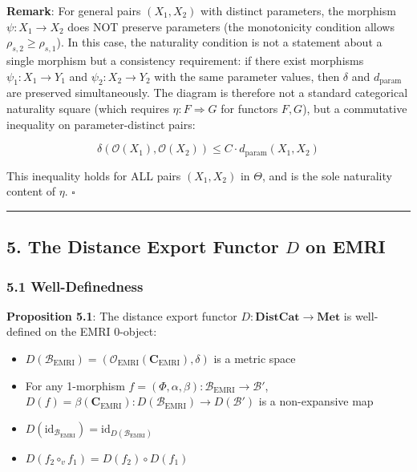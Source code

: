 \documentclass[
]{article}
\providecommand{\tightlist}{%
  \setlength{\itemsep}{0pt}\setlength{\parskip}{0pt}}
\begin{document}
\textbf{Remark}: For general pairs \((X_1, X_2)\) with distinct
parameters, the morphism \(\psi: X_1 \to X_2\) does NOT preserve
parameters (the monotonicity condition allows
\(\rho_{s,2} \geq \rho_{s,1}\)). In this case, the naturality condition
is not a statement about a single morphism but a consistency
requirement: if there exist morphisms \(\psi_1: X_1 \to Y_1\) and
\(\psi_2: X_2 \to Y_2\) with the same parameter values, then \(\delta\)
and \(d_{\text{param}}\) are preserved simultaneously. The diagram is
therefore not a standard categorical naturality square (which requires
\(\eta: F \Rightarrow G\) for functors \(F, G\)), but a commutative
inequality on parameter-distinct pairs:

\[\delta(\mathcal{O}(X_1), \mathcal{O}(X_2)) \leq C \cdot d_{\text{param}}(X_1, X_2)\]

This inequality holds for ALL pairs \((X_1, X_2)\) in \(\Theta\), and is
the sole naturality content of \(\eta\). \(\square\)

\begin{center}\rule{0.5\linewidth}{0.5pt}\end{center}

\subsection{\texorpdfstring{5. The Distance Export Functor \(D\) on
EMRI}{5. The Distance Export Functor D on EMRI}}\label{the-distance-export-functor-d-on-emri}

\subsubsection{5.1 Well-Definedness}\label{well-definedness}

\textbf{Proposition 5.1}: The distance export functor
\(D: \mathbf{DistCat} \to \mathbf{Met}\) is well-defined on the EMRI
0-object:

\begin{itemize}
\tightlist
\item
  \(D(\mathcal{B}_{\text{EMRI}}) = (\mathcal{O}_{\text{EMRI}}(\mathbf{C}_{\text{EMRI}}), \delta)\)
  is a metric space
\item
  For any 1-morphism
  \(f = (\Phi, \alpha, \beta): \mathcal{B}_{\text{EMRI}} \to \mathcal{B}'\),
  \(D(f) = \beta(\mathbf{C}_{\text{EMRI}}): D(\mathcal{B}_{\text{EMRI}}) \to D(\mathcal{B}')\)
  is a non-expansive map
\item
  \(D(\text{id}_{\mathcal{B}_{\text{EMRI}}}) = \text{id}_{D(\mathcal{B}_{\text{EMRI}})}\)
\item
  \(D(f_2 \circ_v f_1) = D(f_2) \circ D(f_1)\)
\end{itemize}
\end{document}
